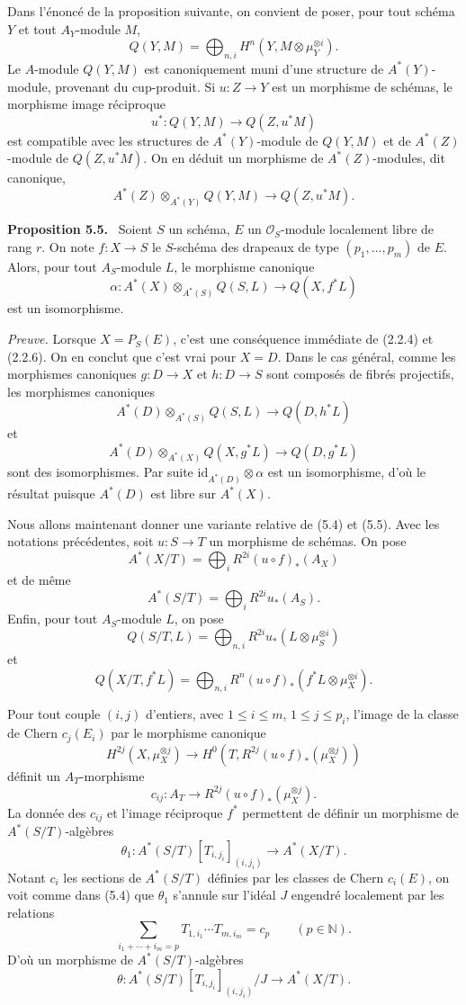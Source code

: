 \documentclass[11pt]{article}
\newenvironment{statement}[1]{\par\medskip\noindent\textbf{#1.}\ }{\par\medskip}
\begin{document}
Dans l'énoncé de la proposition suivante, on convient de poser, pour tout schéma $Y$ et tout $A_Y$-module $M$,
\[
Q(Y,M)=\bigoplus_{n,i}H^n(Y,M\otimes\mu_Y^{\otimes i}).
\]
Le $A$-module $Q(Y,M)$ est canoniquement muni d'une structure de $A^*(Y)$-module, provenant du cup-produit. Si $u:Z\to Y$ est un morphisme de schémas, le morphisme image réciproque
\[
u^*:Q(Y,M)\to Q(Z,u^*M)
\]
est compatible avec les structures de $A^*(Y)$-module de $Q(Y,M)$ et de $A^*(Z)$-module de $Q(Z,u^*M)$. On en déduit un morphisme de $A^*(Z)$-modules, dit canonique,
\[
A^*(Z)\otimes_{A^*(Y)}Q(Y,M)\to Q(Z,u^*M).
\]

\begin{statement}{Proposition 5.5}
Soient $S$ un schéma, $E$ un $\mathcal O_S$-module localement libre de rang $r$. On note $f:X\to S$ le $S$-schéma des drapeaux de type $(p_1,\ldots,p_m)$ de $E$. Alors, pour tout $A_S$-module $L$, le morphisme canonique
\[
\alpha:A^*(X)\otimes_{A^*(S)}Q(S,L)\to Q(X,f^*L)
\]
est un isomorphisme.
\end{statement}

\emph{Preuve.} Lorsque $X=P_S(E)$, c'est une conséquence immédiate de (2.2.4) et (2.2.6). On en conclut que c'est vrai pour $X=D$. Dans le cas général, comme les morphismes canoniques $g:D\to X$ et $h:D\to S$ sont composés de fibrés projectifs, les morphismes canoniques
\[
A^*(D)\otimes_{A^*(S)}Q(S,L)\to Q(D,h^*L)
\]
et
\[
A^*(D)\otimes_{A^*(X)}Q(X,g^*L)\to Q(D,g^*L)
\]
sont des isomorphismes. Par suite $\mathrm{id}_{A^*(D)}\otimes\alpha$ est un isomorphisme, d'où le résultat puisque $A^*(D)$ est libre sur $A^*(X)$.

Nous allons maintenant donner une variante relative de (5.4) et (5.5). Avec les notations précédentes, soit $u:S\to T$ un morphisme de schémas. On pose
\[
A^*(X/T)=\bigoplus_i R^{2i}(u\circ f)_*(A_X)
\]
et de même
\[
A^*(S/T)=\bigoplus_i R^{2i}u_*(A_S).
\]
Enfin, pour tout $A_S$-module $L$, on pose
\[
Q(S/T,L)=\bigoplus_{n,i}R^{2i}u_*(L\otimes\mu_S^{\otimes i})
\]
et
\[
Q(X/T,f^*L)=\bigoplus_{n,i}R^n(u\circ f)_*(f^*L\otimes\mu_X^{\otimes i}).
\]

Pour tout couple $(i,j)$ d'entiers, avec $1\le i\le m$, $1\le j\le p_i$, l'image de la classe de Chern $c_j(E_i)$ par le morphisme canonique
\[
H^{2j}(X,\mu_X^{\otimes j})
\to H^0(T,R^{2j}(u\circ f)_*(\mu_X^{\otimes j}))
\]
définit un $A_T$-morphisme
\[
c_{ij}:A_T\to R^{2j}(u\circ f)_*(\mu_X^{\otimes j}).
\]
La donnée des $c_{ij}$ et l'image réciproque $f^*$ permettent de définir un morphisme de $A^*(S/T)$-algèbres
\[
\theta_1:A^*(S/T)[T_{i,j_i}]_{(i,j_i)}\to A^*(X/T).
\]
Notant $c_i$ les sections de $A^*(S/T)$ définies par les classes de Chern $c_i(E)$, on voit comme dans (5.4) que $\theta_1$ s'annule sur l'idéal $J$ engendré localement par les relations
\[
\sum_{i_1+\cdots+i_m=p}T_{1,i_1}\cdots T_{m,i_m}=c_p\qquad(p\in\mathbb N).
\]
D'où un morphisme de $A^*(S/T)$-algèbres
\[
\theta:A^*(S/T)[T_{i,j_i}]_{(i,j_i)}/J\to A^*(X/T).
\]
\end{document}
